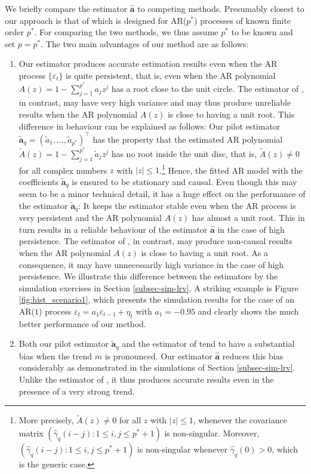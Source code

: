We briefly compare the estimator $\widehat{\boldsymbol{a}}$ to competing methods. Presumably closest to our approach is that of \cite{Hall2003} which is designed for AR($p^*$) processes of known finite order $p^*$. For comparing the two methods, we thus assume $p^*$ to be known and set $p=p^*$. The two main advantages of our method are as follows: 
\begin{enumerate}[label=(\alph*),leftmargin=0.7cm]
\item Our estimator produces accurate estimation results even when the AR process $\{\varepsilon_t\}$ is quite persistent, that is, even when the AR polynomial $A(z) = 1 - \sum_{j=1}^{p^*} a_j z^j$ has a root close to the unit circle. The estimator of \cite{Hall2003}, in contrast, may have very high variance and may thus produce unreliable results when the AR polynomial $A(z)$ is close to having a unit root. This difference in behaviour can be explained as follows: Our pilot estimator $\widetilde{\boldsymbol{a}}_q = (\widetilde{a}_1,\ldots,\widetilde{a}_{p^*})^\top$ has the property that the estimated AR polynomial $\widetilde{A}(z) = 1 - \sum_{j=1}^{p^*} \widetilde{a}_j z^j$ has no root inside the unit disc, that is, $\widetilde{A}(z) \ne 0$ for all complex numbers $z$ with $|z| \le 1$.\footnote{More precisely, $\widetilde{A}(z) \ne 0$ for all $z$ with $|z| \le 1$, whenever the covariance matrix $(\widehat{\gamma}_q(i-j): 1 \le i,j \le p^*+1)$ is non-singular. Moreover, $(\widehat{\gamma}_q(i-j): 1 \le i,j \le p^*+1)$ is non-singular whenever $\widehat{\gamma}_q(0) > 0$, which is the generic case.} Hence, the fitted AR model with the coefficients $\widetilde{\boldsymbol{a}}_q$ is ensured to be stationary and causal. Even though this may seem to be a minor technical detail, it has a huge effect on the performance of the estimator $\widetilde{\boldsymbol{a}}_q$: It keeps the estimator stable even when the AR process is very persistent and the AR polynomial $A(z)$ has almost a unit root. This in turn results in a reliable behaviour of the estimator $\widehat{\boldsymbol{a}}$ in the case of high persistence. The estimator of \cite{Hall2003}, in contrast, may produce non-causal results when the AR polynomial $A(z)$ is close to having a unit root. As a consequence, it may have unnecessarily high variance in the case of high persistence. We illustrate this difference between the estimators by the simulation exercises in Section \ref{subsec-sim-lrv}. A striking example is Figure \ref{fig:hist_scenario1}, which presents the simulation results for the case of an AR($1$) process $\varepsilon_t = a_1 \varepsilon_{t-1} + \eta_t$ with $a_1 = -0.95$ and clearly shows the much better performance of our method.  
\item Both our pilot estimator $\widetilde{\boldsymbol{a}}_q$ and the estimator of \cite{Hall2003} tend to have a substantial bias when the trend $m$ is pronounced. Our estimator $\widehat{\boldsymbol{a}}$ reduces this bias considerably as demonstrated in the simulations of Section \ref{subsec-sim-lrv}. Unlike the estimator of \cite{Hall2003}, it thus produces accurate results even in the presence of a very strong trend. 
\end{enumerate}


